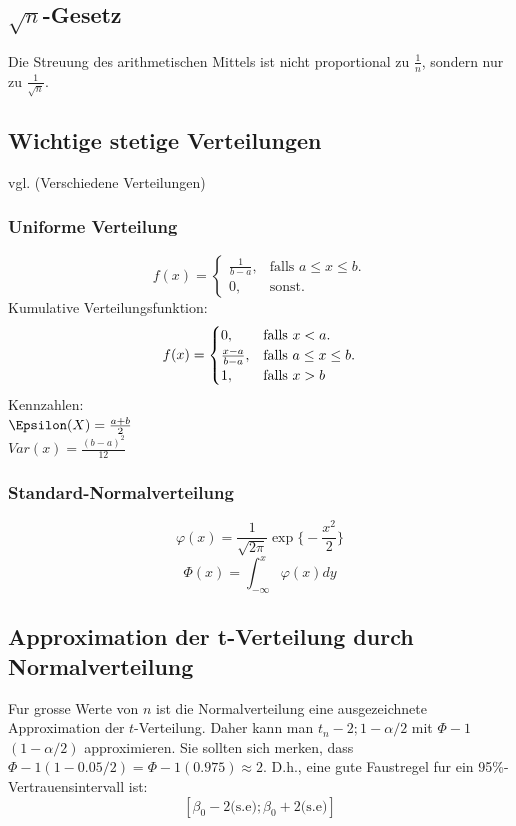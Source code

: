 \documentclass{article}
\begin{document}
\begin{multicols*}{3}
  \subsection{$\sqrt{n}$-Gesetz}
  Die Streuung des arithmetischen Mittels ist nicht proportional zu $\frac{1}{n}$,
  sondern nur zu $\frac{1}{\sqrt{n}}$.

  \subsection{Wichtige stetige Verteilungen}
  vgl. (Verschiedene Verteilungen)\\
    \subsubsection{Uniforme Verteilung}
      \begin{equation}
        f(x)=\begin{cases}
          \frac{1}{b-a}, & \text{falls $a\leq x \leq b$}.\\
          0, & \text{sonst}.
        \end{cases}
      \end{equation}
      Kumulative Verteilungsfunktion:
      \begin{equation}
        f(x)=\begin{cases}
          0, & \text{falls $x<a$}.\\
          \frac{x-a}{b-a}, & \text{falls $ a\leq x \leq b $}.\\
          1, & \text{falls $x > b$}
        \end{cases}
      \end{equation}
      Kennzahlen:\\
      $\Epsilon(X) = \frac{a+b}{2}$\\
      $Var(x)= \frac{(b-a)^2}{12}$

      \subsubsection{Standard-Normalverteilung}

      $$\varphi(x)= \frac{1}{\sqrt{2\pi}} \exp \big\{ -\frac{x^2}{2} \big\}$$
      $$\Phi (x)= \int_{-\infty}^{x}\varphi(x) dy$$

      \subsection{Approximation der t-Verteilung durch Normalverteilung}
      Fur grosse Werte von $n$ ist die Normalverteilung eine ausgezeichnete Approximation
      der $t$-Verteilung. Daher kann man $t_n-2;1-\alpha /2$ mit $\Phi - 1$
      $(1-\alpha /2)$ approximieren.
      Sie sollten sich merken, dass $\Phi-1
      (1 - 0.05/2) = \Phi-1(0.975) ≈ 2$. D.h.,
      eine gute Faustregel fur ein 95\%-Vertrauensintervall ist:
      $$[\beta_0 -2 \text{(s.e)};\beta_0+2\text{(s.e)}]$$

\end{multicols*}
\end{document}
